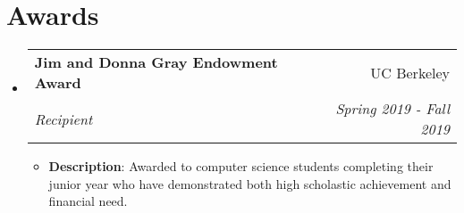\documentclass[letterpaper,11pt]{article}
\makeatletter
\newcommand{\resumeItem}[2]{
  \item\small{
    \textbf{#1}{: #2 \vspace{-2pt}}
  }
}
\newcommand{\resumeSubheading}[4]{
  \vspace{-1pt}\item
    \begin{tabular*}{0.97\textwidth}[t]{l@{\extracolsep{\fill}}r}
      \textbf{#1} & #2 \\
      \textit{\small#3} & \textit{\small #4} \\
    \end{tabular*}\vspace{-5pt}
}
\newcommand{\resumeSubHeadingListStart}{\begin{itemize}[leftmargin=*]}
\newcommand{\resumeSubHeadingListEnd}{\end{itemize}}
\newcommand{\resumeItemListStart}{\begin{itemize}}
\newcommand{\resumeItemListEnd}{\end{itemize}\vspace{-5pt}}
\makeatother
\begin{document}
\section{Awards}
  \resumeSubHeadingListStart
    \resumeSubheading
      {Jim and Donna Gray Endowment Award}{UC Berkeley}
      {Recipient}{Spring 2019 - Fall 2019}
      \resumeItemListStart
        \resumeItem{Description}
          {Awarded to computer science students completing their junior year who have demonstrated both high scholastic achievement and financial need.}
      \resumeItemListEnd
  \resumeSubHeadingListEnd

%


\end{document}
